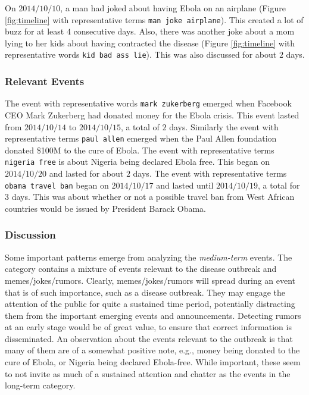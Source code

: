 On $2014/10/10$, a man had joked about having Ebola on an airplane (Figure \ref{fig:timeline} with
representative terms \texttt{man joke airplane}).  This created a lot
of buzz for at least $4$ consecutive days.  Also, there was another joke about
a mom lying to her kids about having contracted the disease (Figure \ref{fig:timeline} with
representative words \texttt{kid bad ass lie}).  This was also discussed for about
$2$ days.

\subsubsection{Relevant Events}
The event with representative words \texttt{mark zukerberg}
emerged when Facebook CEO Mark Zukerberg had donated money for the Ebola crisis.
This event lasted from $2014/10/14$ to $2014/10/15$, a total of $2$ days.
Similarly the event with representative terms \texttt{paul allen} emerged 
when the Paul Allen foundation donated \$100M to
the cure of Ebola.
The event with representative terms \texttt{nigeria free} is about Nigeria being
declared Ebola free.  This began on $2014/10/20$ and lasted for about $2$ days.
The event with representative terms \texttt{obama travel ban} began on $2014/10/17$
and lasted until $2014/10/19$, a total for $3$ days.  This was about whether or not
a possible travel ban from West African countries would be issued by President Barack
Obama.  

\subsubsection{Discussion} 
Some important patterns emerge from analyzing the \emph{medium-term} events.
The category
contains a mixture of events relevant to the disease outbreak and
memes/jokes/rumors. Clearly, 
memes/jokes/rumors will spread during an event that is 
of such importance, such as a disease outbreak. 
They may engage the attention of the
public for quite a sustained time period, 
potentially distracting
them from the important emerging events and announcements.
Detecting rumors at an early stage would be of great value, 
to ensure that correct information is disseminated. 
An observation about the events relevant to the outbreak is that 
many of them are of a somewhat positive note, e.g., money
being donated to the cure of Ebola, or Nigeria being
declared Ebola-free. While important, these seem to
not invite as much of a sustained attention and chatter as the
events in the long-term  category.

